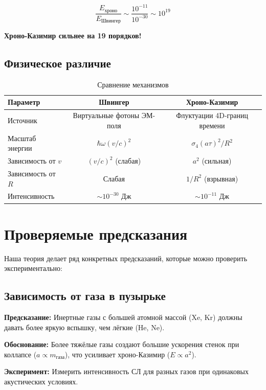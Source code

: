 \documentclass[12pt,a4paper]{article}
\begin{document}
\begin{equation}
\frac{E_{\text{хроно}}}{E_{\text{Швингер}}} \sim \frac{10^{-11}}{10^{-30}} \sim 10^{19}
\end{equation}

\textbf{Хроно-Казимир сильнее на 19 порядков!}

\subsection{Физическое различие}

\begin{table}[h]
\centering
\caption{Сравнение механизмов}
\begin{tabular}{lcc}
\toprule
\textbf{Параметр} & \textbf{Швингер} & \textbf{Хроно-Казимир} \\
\midrule
Источник & Виртуальные фотоны ЭМ-поля & Флуктуации 4D-границ времени \\
Масштаб энергии & $\hbar\omega (v/c)^2$ & $\sigma_4 (a\tau)^2/R^2$ \\
Зависимость от $v$ & $(v/c)^2$ (слабая) & $a^2$ (сильная) \\
Зависимость от $R$ & Слабая & $1/R^2$ (взрывная) \\
Интенсивность & $\sim 10^{-30}$ Дж & $\sim 10^{-11}$ Дж \\
\bottomrule
\end{tabular}
\end{table}

\section{Проверяемые предсказания}
\label{sec:predictions}

Наша теория делает ряд конкретных предсказаний, которые можно проверить экспериментально:

\subsection{Зависимость от газа в пузырьке}

\textbf{Предсказание:} Инертные газы с большей атомной массой (Xe, Kr) должны давать более яркую вспышку, чем лёгкие (He, Ne).

\textbf{Обоснование:} Более тяжёлые газы создают большие ускорения стенок при коллапсе ($a \propto m_{\text{газа}}$), что усиливает хроно-Казимир ($E \propto a^2$).

\textbf{Эксперимент:} Измерить интенсивность СЛ для разных газов при одинаковых акустических условиях.
\end{document}
